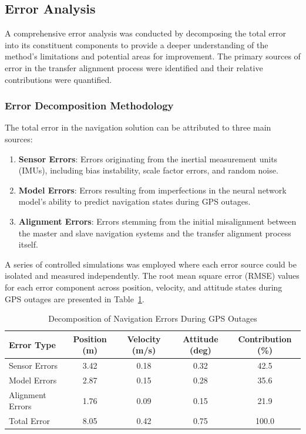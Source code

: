 \documentclass[3p]{elsarticle}
\begin{document}
\subsection{Error Analysis}\label{sec:error_analysis}
\noindent A comprehensive error analysis was conducted by decomposing the total error into its constituent components to provide a deeper understanding of the method's limitations and potential areas for improvement. The primary sources of error in the transfer alignment process were identified and their relative contributions were quantified.

\subsubsection{Error Decomposition Methodology}
The total error in the navigation solution can be attributed to three main sources:
\begin{enumerate}
	\item \textbf{Sensor Errors}: Errors originating from the inertial measurement units (IMUs), including bias instability, scale factor errors, and random noise.
	\item \textbf{Model Errors}: Errors resulting from imperfections in the neural network model's ability to predict navigation states during GPS outages.
	\item \textbf{Alignment Errors}: Errors stemming from the initial misalignment between the master and slave navigation systems and the transfer alignment process itself.
\end{enumerate}

A series of controlled simulations was employed where each error source could be isolated and measured independently. The root mean square error (RMSE) values for each error component across position, velocity, and attitude states during GPS outages are presented in Table~\ref{tab:error_decomposition}.

\begin{table}[H]
	\centering
	\caption{Decomposition of Navigation Errors During GPS Outages}
	\label{tab:error_decomposition}
	\begin{tabular}{l c c c c}
		\hline
		\textbf{Error Type} & \textbf{Position (m)} & \textbf{Velocity (m/s)} & \textbf{Attitude (deg)} & \textbf{Contribution (\%)} \\
		\hline
		Sensor Errors & 3.42 & 0.18 & 0.32 & 42.5 \\
		Model Errors & 2.87 & 0.15 & 0.28 & 35.6 \\
		Alignment Errors & 1.76 & 0.09 & 0.15 & 21.9 \\
		\hline
		Total Error & 8.05 & 0.42 & 0.75 & 100.0 \\
		\hline
	\end{tabular}
\end{table}
\end{document}
